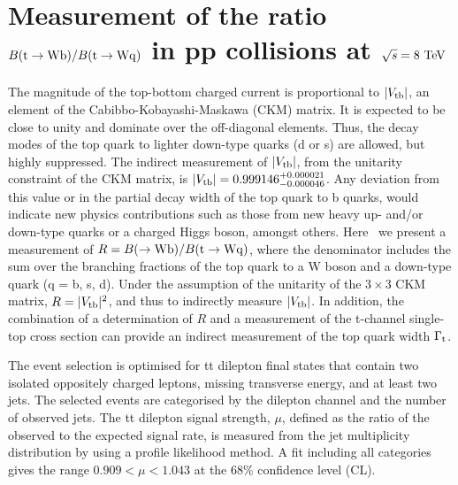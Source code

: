 \documentclass[a4paper]{PoS}
\begin{document}
\section{Measurement of the ratio $B({\rm t}\to{\rm Wb})/B({\rm t}\to{\rm Wq})$
in pp collisions at $\sqrt{s} = 8~\rm{TeV}$}

The magnitude of the top-bottom charged current is proportional to $|V_{\rm tb}|$,
an element of the Cabibbo-Kobayashi-Maskawa (CKM) matrix. It is expected to be close
to unity and dominate over the off-diagonal elements. Thus, the decay modes of the
top quark to lighter down-type quarks (d or s) are allowed, but highly suppressed.
The indirect measurement of $|V_{\rm tb}|$, from the unitarity constraint of the CKM
matrix, is $|V_{\rm tb}| = 0.999146_{-0.000046}^{+0.000021}$. Any deviation from this value
or in the partial decay width of the top quark to b quarks, would indicate new physics
contributions such as those from new heavy up- and/or down-type quarks or a charged
Higgs boson, amongst others. Here~\cite{CMS_tWb_tWq_ratio} we present a measurement
of $R = B({\rm \to Wb})/B({\rm t \to Wq})$, where the denominator includes the sum over
the branching fractions of the top quark to a W boson and a down-type quark (q = b, s, d).
Under the assumption of the unitarity of the $3 \times 3$ CKM matrix, $R = |V_{\rm tb}|^2$,
and thus to indirectly measure $|V_{\rm tb}|$. In addition, the combination of a
determination of $R$ and a measurement of the t-channel single-top cross section
can provide an indirect measurement of the top quark width $\Gamma_{\rm t}$.

The event selection is optimised for tt dilepton final states that contain two isolated
oppositely charged leptons, missing transverse energy, and at least two jets. The selected
events are categorised by the dilepton channel and the number of observed jets. The
tt dilepton signal strength, $\mu$, defined as the ratio of the observed to the expected
signal rate, is measured from the jet multiplicity distribution by using a profile
likelihood method. A fit including all categories gives the range
$0.909 < \mu < 1.043$ at the 68\% confidence level (CL).
\end{document}
